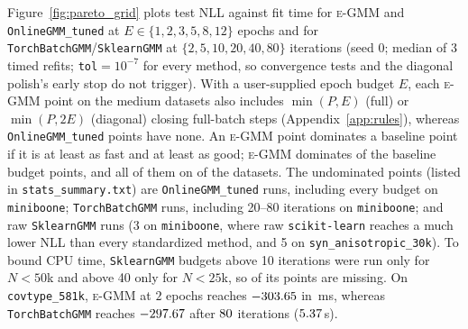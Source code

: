 \documentclass[10pt]{article} %
\newcommand{\egmm}{\textsc{e-GMM}}
\begin{document}
Figure~\ref{fig:pareto_grid} plots test NLL against fit time for \egmm{} and \texttt{OnlineGMM\_tuned} at $E \in \{1, 2, 3, 5, 8, 12\}$ epochs and for \texttt{TorchBatchGMM}/\texttt{SklearnGMM} at $\{2, 5, 10, 20, 40, 80\}$ iterations (seed 0; median of 3 timed refits; \texttt{tol}$=10^{-7}$ for every method, so convergence tests and the diagonal polish's early stop do not trigger). With a user-supplied epoch budget $E$, each \egmm{} point on the medium datasets also includes $\min(P, E)$ (full) or $\min(P, 2E)$ (diagonal) closing full-batch steps (Appendix~\ref{app:rules}), whereas \texttt{OnlineGMM\_tuned} points have none. An \egmm{} point dominates a baseline point if it is at least as fast and at least as good; \egmm{} dominates \rParetoDominated{} of the \rParetoPoints{} baseline budget points, and all of them on \rParetoFullDom{} of the \rParetoDatasets{} datasets. The \rParetoUndom{} undominated points (listed in \texttt{stats\_summary.txt}) are \rParetoUndomOnline{} \texttt{OnlineGMM\_tuned} runs, including every budget on \texttt{miniboone}; \rParetoUndomTB{} \texttt{TorchBatchGMM} runs, including 20--80 iterations on \texttt{miniboone}; and \rParetoUndomSK{} raw \texttt{SklearnGMM} runs (3 on \texttt{miniboone}, where raw \texttt{scikit-learn} reaches a much lower NLL than every standardized method, and 5 on \texttt{syn\_anisotropic\_30k}). To bound CPU time, \texttt{SklearnGMM} budgets above 10 iterations were run only for $N < 50$k and above 40 only for $N < 25$k, so \rParetoSKSkipped{} of its points are missing. On \texttt{covtype\_581k}, \egmm{} at $2$ epochs reaches $-303.65$ in \rParetoCovEGMMms\,ms, whereas \texttt{TorchBatchGMM} reaches $-297.67$ after $80$ iterations ($5.37$\,s).
\end{document}

